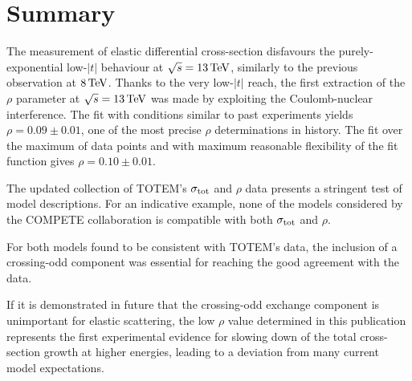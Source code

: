\section{Summary}
\label{sec:summary}

The measurement of elastic differential cross-section disfavours the purely-exponential low-$|t|$ behaviour at $\sqrt s = 13\,{\rm TeV}$, similarly to the previous observation at $8\,{\rm TeV}$. Thanks to the very low-$|t|$ reach, the first extraction of the $\rho$ parameter at $\sqrt s = 13\,{\rm TeV}$ was made by exploiting the Coulomb-nuclear interference. The fit with conditions similar to past experiments yields $\rho = 0.09 \pm 0.01$, one of the most precise $\rho$ determinations in history. The fit over the maximum of data points and with maximum reasonable flexibility of the fit function gives $\rho = 0.10 \pm 0.01$.

The updated collection of TOTEM's $\sigma_{\rm tot}$ and $\rho$ data presents a stringent test of model descriptions. For an indicative example, none of the models considered by the COMPETE collaboration is compatible with both $\sigma_{\rm tot}$ and $\rho$.

For both models found to be consistent with TOTEM's data, the inclusion of a crossing-odd component was essential for reaching the good agreement with the data.

If it is demonstrated in future that the crossing-odd exchange component is unimportant for elastic scattering, the low $\rho$ value determined in this publication represents the first experimental evidence for slowing down of the total cross-section growth at higher energies, leading to a deviation from many current model expectations.
